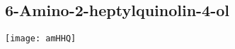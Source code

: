 {{%

\subsection{6-Amino-2-heptylquinolin-4-ol }

\begin{scheme}[H]
	\begin{center}
		\texttt{[image: amHHQ]}
	\end{center}
\end{scheme}

}}
